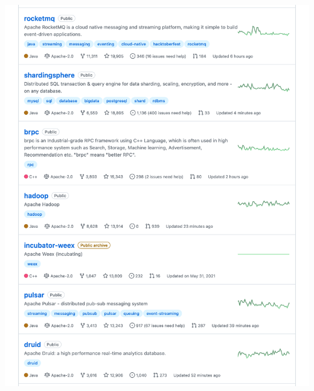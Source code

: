 \Continuing
\begin{center}
    \includegraphics[width=40em]{beam-github-stars-dropdown-p3}
\end{center}
\WillContinue
\pagebreak

